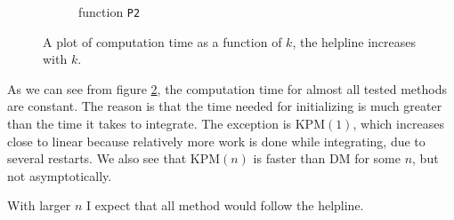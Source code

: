 \begin{figure}[H]
\begin{subfigure}[b]{0.45\textwidth}
                \caption{function \texttt{P2}}
                \label{fig:timek2}
        \end{subfigure}
        \caption{A plot of computation time as a function of $k$, the helpline increases with $k$.}\label{fig:timek}
\end{figure}
As we can see from figure \ref{fig:timek}, the computation time for almost all tested methods are constant. The reason is that the time needed for initializing is much greater than the time it takes to integrate. 
The exception is KPM$(1)$, which increases close to linear because relatively more work is done while integrating, due to several restarts. 
We also see that KPM$(n)$ is faster than DM for some $n$, but not asymptotically.

With larger $n$ I expect that all method would follow the helpline.
